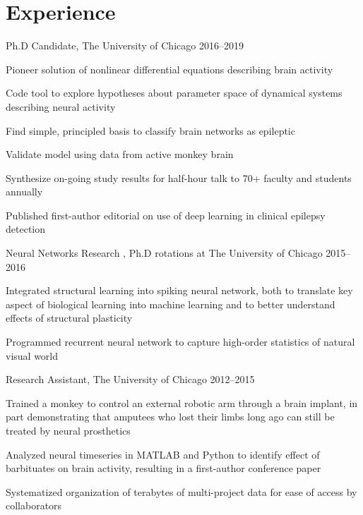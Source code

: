 \documentclass[]{friggeri-cv} %
\begin{document}
\section{Experience}
\begin{entrylist}

\entry%
{Ph.D Candidate{\normalfont , The University of Chicago}}%
{2016--2019}
{%
	\item{Pioneer solution of nonlinear differential equations describing brain activity}%
	\item{Code tool to explore hypotheses about parameter space of dynamical systems describing neural activity}
	\item{Find simple, principled basis to classify brain networks as epileptic}
	\item{Validate model using data from active monkey brain}
	\item{Synthesize on-going study results for half-hour talk to 70+ faculty and students annually}
	\item{Published first-author editorial on use of deep learning in clinical epilepsy detection}
}
\entry
{Neural Networks Research {\normalfont , Ph.D rotations at The University of Chicago}}
{2015--2016}
{%
	\item{Integrated structural learning into spiking neural network, both to translate key aspect of biological learning into machine learning and to better understand effects of structural plasticity}
	\item{Programmed recurrent neural network to capture high-order statistics of natural visual world}
}
\entry
{Research Assistant{\normalfont , The University of Chicago}}
{2012--2015}
{%
		\item{Trained a monkey to control an external robotic arm through a brain implant, in part demonstrating that amputees who lost their limbs long ago can still be treated by neural prosthetics}
		\item{Analyzed neural timeseries in MATLAB and Python to identify effect of barbituates on brain activity, resulting in a first-author conference paper}
		\item{Systematized organization of terabytes of multi-project data for ease of access by collaborators}%
}


\end{entrylist}
\end{document}
